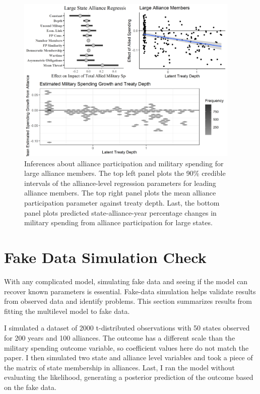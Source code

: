 \documentclass[12pt]{article}
\begin{document}
\begin{figure}[htbp]
	\centering
		\includegraphics[width=0.95\textwidth]{lg-res.png}
	\caption{Inferences about alliance participation and military spending for large alliance members. The top left panel plots the 90\% credible intervals of the alliance-level regression parameters for leading alliance members. The top right panel plots the mean alliance participation parameter against treaty depth. Last, the bottom panel plots predicted state-alliance-year percentage changes in military spending from alliance participation for large states.}
	\label{fig:lg-res}
\end{figure}



\section{Fake Data Simulation Check}


With any complicated model, simulating fake data and seeing if the model can recover known parameters is essential. 
Fake-data simulation helps validate results from observed data and identify problems. 
This section summarizes results from fitting the multilevel model to fake data.


I simulated a dataset of 2000 t-distributed observations with 50 states observed for 200 years and 100 alliances. 
The outcome has a different scale than the military spending outcome variable, so coefficient values here do not match the paper.  
I then simulated two state and alliance level variables and took a piece of the matrix of state membership in alliances. 
Last, I ran the model without evaluating the likelihood, generating a posterior prediction of the outcome based on the fake data.
\end{document}
